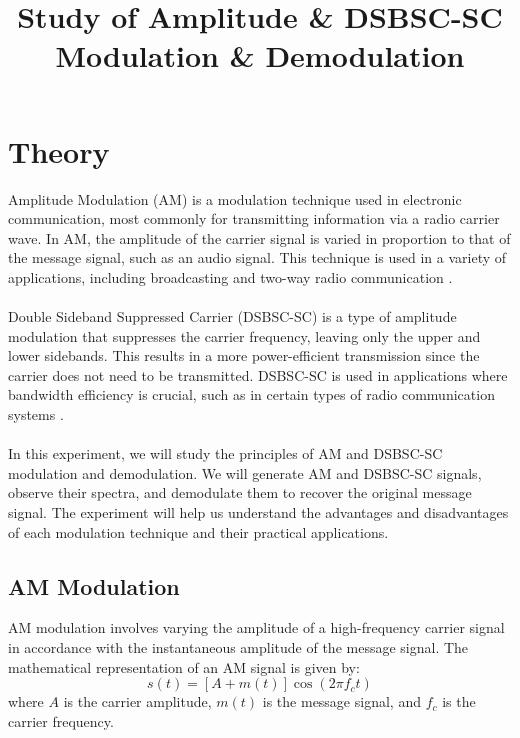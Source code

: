 \documentclass[12pt]{article}
\title{Study of Amplitude \& DSB\-SC-SC Modulation \& Demodulation}
\author{}
\date{}
\begin{document}


\pagebreak

\tableofcontents

\pagebreak
{}
\maketitle

\section*{Theory}
Amplitude Modulation (AM) is a modulation technique used in electronic communication, most commonly for transmitting information via a radio carrier wave. In AM, the amplitude of the carrier signal is varied in proportion to that of the message signal, such as an audio signal. This technique is used in a variety of applications, including broadcasting and two-way radio communication \cite{haykin2008communication}.
\\\\
Double Sideband Suppressed Carrier (DSB\-SC-SC) is a type of amplitude modulation that suppresses the carrier frequency, leaving only the upper and lower sidebands. This results in a more power-efficient transmission since the carrier does not need to be transmitted. DSB\-SC-SC is used in applications where bandwidth efficiency is crucial, such as in certain types of radio communication systems \cite{proakis2007digital}.
\\\\
In this experiment, we will study the principles of AM and DSB\-SC-SC modulation and demodulation. We will generate AM and DSB\-SC-SC signals, observe their spectra, and demodulate them to recover the original message signal. The experiment will help us understand the advantages and disadvantages of each modulation technique and their practical applications.

\subsection*{AM Modulation}
AM modulation involves varying the amplitude of a high-frequency carrier signal in accordance with the instantaneous amplitude of the message signal. The mathematical representation of an AM signal is given by:
\[
    s(t) = [A + m(t)] \cos(2 \pi f_c t)
\]
where \(A\) is the carrier amplitude, \(m(t)\) is the message signal, and \(f_c\) is the carrier frequency.
\end{document}
